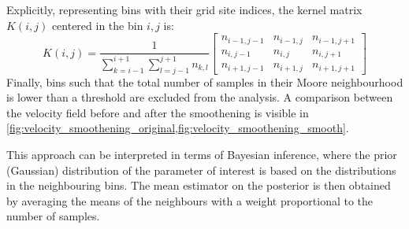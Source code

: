 Explicitly, representing bins with their grid site indices, the kernel matrix $K(i, j)$ centered in the bin $i, j$ is:
\begin{equation}
 K(i, j) = \frac{1}{\displaystyle \sum_{k = i-1}^{i+1}\sum_{l = j-1}^{j+1} n_{k,l}}
 \begin{bmatrix}
  n_{i-1,j-1} & n_{i-1, j} & n_{i-1, j+1} \\
  n_{i,j-1}   & n_{i, j}   & n_{i, j+1}   \\
  n_{i+1,j-1} & n_{i+1, j} & n_{i+1, j+1}
 \end{bmatrix}
\end{equation}
Finally, bins such that the total number of samples in their Moore neighbourhood is lower than a threshold are excluded from the analysis. A comparison between the velocity field before and after the smoothening is visible in \cref{fig:velocity_smoothening_original,fig:velocity_smoothening_smooth}.

This approach can be interpreted in terms of Bayesian inference, where the prior (Gaussian) distribution of the parameter of interest is based on the distributions in the neighbouring bins. The mean estimator on the posterior is then obtained by averaging the means of the neighbours with a weight proportional to the number of samples.


